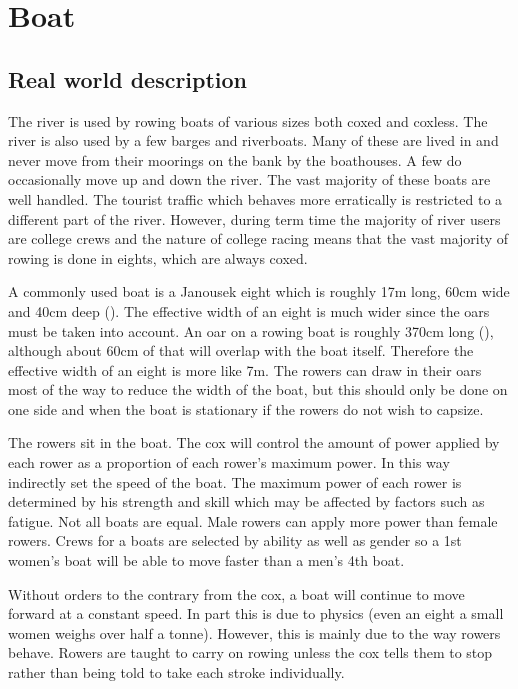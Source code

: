     \section{Boat}
      \subsection{Real world description}
      The river is used by rowing boats of various sizes both coxed and coxless. The river is also used by a few barges and riverboats. Many of these are lived in and never move from their moorings on the bank by the boathouses. A few do occasionally move up and down the river. The vast majority of these boats are well handled. The tourist traffic which behaves more erratically is restricted to a different part of the river. However, during term time the majority of river users are college crews and the nature of college racing means that the vast majority of rowing is done in eights, which are always coxed.
      
      A commonly used boat is a Janousek eight which is roughly 17m long, 60cm wide and 40cm deep (\cite{Janousek}). The effective width of an eight is much wider since the oars must be taken into account. An oar on a rowing boat is roughly 370cm long (\cite{Concept2}), although about 60cm of that will overlap with the boat itself. Therefore the effective width of an eight is more like 7m. The rowers can draw in their oars most of the way to reduce the width of the boat, but this should only be done on one side and when the boat is stationary if the rowers do not wish to capsize. 
      
      The rowers sit in the boat. The cox will control the amount of power applied by each rower as a proportion of each rower's maximum power. In this way indirectly set the speed of the boat. The maximum power of each rower is determined by his strength and skill which may be affected by factors such as fatigue. Not all boats are equal. Male rowers can apply more power than female rowers. Crews for a boats are selected by ability as well as gender so a 1st women's boat will be able to move faster than a men's 4th boat.
      
      Without orders to the contrary from the cox, a boat will continue to move forward at a constant speed. In part this is due to physics (even an eight a small women weighs over half a tonne). However, this is mainly due to the way rowers behave. Rowers are taught to carry on rowing unless the cox tells them to stop rather than being told to take each stroke individually.
      

